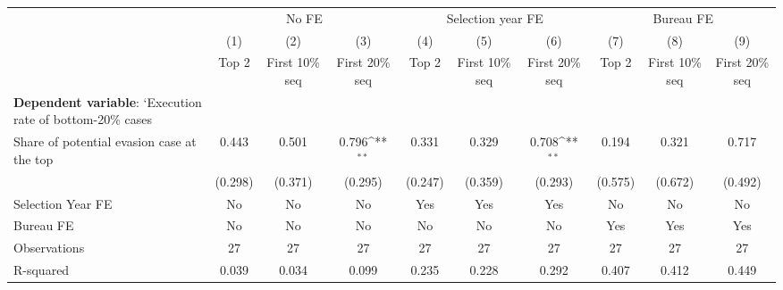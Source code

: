 {
\def\sym#1{\ifmmode^{#1}\else\(^{#1}\)\fi}
\begin{tabular}{l*{9}{c}}
\toprule
            &\multicolumn{3}{c}{No FE}                                        &\multicolumn{3}{c}{Selection year FE}                            &\multicolumn{3}{c}{Bureau FE}                                    \\\cmidrule(lr){2-4}\cmidrule(lr){5-7}\cmidrule(lr){8-10}
            &\multicolumn{1}{c}{(1)}&\multicolumn{1}{c}{(2)}&\multicolumn{1}{c}{(3)}&\multicolumn{1}{c}{(4)}&\multicolumn{1}{c}{(5)}&\multicolumn{1}{c}{(6)}&\multicolumn{1}{c}{(7)}&\multicolumn{1}{c}{(8)}&\multicolumn{1}{c}{(9)}\\
            &\multicolumn{1}{c}{Top 2}&\multicolumn{1}{c}{First 10\% seq}&\multicolumn{1}{c}{First 20\% seq}&\multicolumn{1}{c}{Top 2}&\multicolumn{1}{c}{First 10\% seq}&\multicolumn{1}{c}{First 20\% seq}&\multicolumn{1}{c}{Top 2}&\multicolumn{1}{c}{First 10\% seq}&\multicolumn{1}{c}{First 20\% seq}\\
\midrule
\textbf{Dependent variable}: `Execution rate of bottom-20\% cases&                     &                     &                     &                     &                     &                     &                     &                     &                     \\
\addlinespace
Share of potential evasion case at the top&       0.443         &       0.501         &       0.796\sym{**} &       0.331         &       0.329         &       0.708\sym{**} &       0.194         &       0.321         &       0.717         \\
            &     (0.298)         &     (0.371)         &     (0.295)         &     (0.247)         &     (0.359)         &     (0.293)         &     (0.575)         &     (0.672)         &     (0.492)         \\
\midrule
Selection Year FE&          No         &          No         &          No         &         Yes         &         Yes         &         Yes         &          No         &          No         &          No         \\
Bureau FE   &          No         &          No         &          No         &          No         &          No         &          No         &         Yes         &         Yes         &         Yes         \\
Observations&          27         &          27         &          27         &          27         &          27         &          27         &          27         &          27         &          27         \\
R-squared   &       0.039         &       0.034         &       0.099         &       0.235         &       0.228         &       0.292         &       0.407         &       0.412         &       0.449         \\
\bottomrule
\end{tabular}
}
